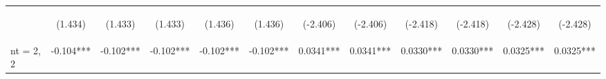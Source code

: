 \documentclass[]{article}
\begin{document}
\begin{center}
\begin{tabular}{lccccccccccc}
        \vspace{4pt}     & \begin{footnotesize}(1.434)\end{footnotesize}  & \begin{footnotesize}(1.433)\end{footnotesize}  & \begin{footnotesize}(1.433)\end{footnotesize}  & \begin{footnotesize}(1.436)\end{footnotesize}  & \begin{footnotesize}(1.436)\end{footnotesize}  & \begin{footnotesize}(-2.406)\end{footnotesize}  & \begin{footnotesize}(-2.406)\end{footnotesize}  & \begin{footnotesize}(-2.418)\end{footnotesize} & \begin{footnotesize}(-2.418)\end{footnotesize} & \begin{footnotesize}(-2.428)\end{footnotesize} & \begin{footnotesize}(-2.428)\end{footnotesize} \\
        nt = 2, 2        & -0.104***                                      & -0.102***                                      & -0.102***                                      & -0.102***                                      & -0.102***                                      & 0.0341***                                       & 0.0341***                                       & 0.0330***                                      & 0.0330***                                      & 0.0325***                                      & 0.0325***                                      \\

\end{tabular}
\end{center}
\end{document}
